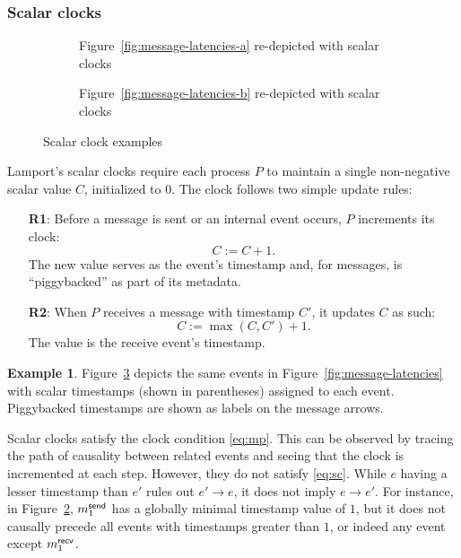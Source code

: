 \documentclass[]             %
{NASA}                       %
\theoremstyle{definition}
\newtheorem{example}[theorem]{Example}
\begin{document}
\subsubsection{Scalar clocks}
\label{sssec:scalar-clocks}
\begin{figure}
  \setlength\belowcaptionskip{5ex}

  \begin{subfigure}{1\textwidth}
    \centering 
    \caption{Figure~\ref{fig:message-latencies-a} re-depicted with scalar clocks}
    \label{fig:message-latencies-scalar-a}
  \end{subfigure}

  \begin{subfigure}{1\textwidth}
    \centering 
    \caption{Figure~\ref{fig:message-latencies-b} re-depicted with scalar clocks}
    \label{fig:message-latencies-scalar-b}
  \end{subfigure}

  \caption{Scalar clock examples}
  \label{fig:message-latencies-scalar}
\end{figure}

Lamport's scalar clocks \cite{1978:lamportclocks} require each
process $P$ to maintain a single non-negative scalar value $C$,
initialized to $0$. The clock follows two simple update rules:
\begin{enumerate}
\item[\textbf{R1}:] Before a message is sent or an internal event occurs, $P$
  increments its clock:
  \[C := C + 1.\]
  The new value serves as the event's timestamp and, for messages, is ``piggybacked''
  as part of its metadata.
\item[\textbf{R2}:] When $P$ receives a message with timestamp $C'$, it
  updates $C$ as such:
  \[C := \max(C, C') + 1.\]
  The value is the receive event's timestamp.
\end{enumerate}

\begin{example}
  Figure~\ref{fig:message-latencies-scalar} depicts the same events in
  Figure~\ref{fig:message-latencies} with scalar timestamps (shown in
  parentheses) assigned to each event. Piggybacked timestamps are
  shown as labels on the message arrows.
\end{example}

Scalar clocks satisfy the clock condition \eqref{eq:mp}. This can be
observed by tracing the path of causality between related events and
seeing that the clock is incremented at each step. However, they do
not satisfy \eqref{eq:sc}.  While $e$ having a lesser timestamp than
$e'$ rules out $e' \to e$, it does not imply $e \to e'$. For instance,
in Figure~\ref{fig:message-latencies-scalar-b}, $m_{1}^{\mathsf{send}}$ has a
globally minimal timestamp value of $1$, but it does not causally
precede all events with timestamps greater than $1$, or indeed any
event except $m_{1}^{\mathsf{recv}}$.
\end{document}
